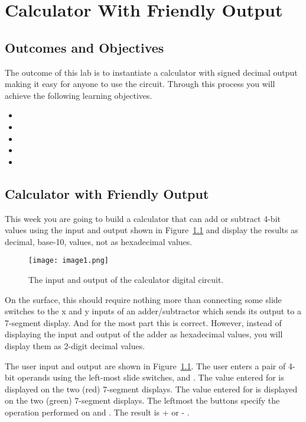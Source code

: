 \chapter{Calculator With Friendly Output}
\label{chapter:calc}
\graphicspath{{./Lab06Calculator/Fig}}

\section{Outcomes and Objectives}

The outcome of this lab is to instantiate a calculator with signed
decimal output making it easy for anyone to use the circuit.
Through this process you will achieve the following
learning objectives.
\begin{itemize}
    \item {}
    \item {}
    \item {}
    \item {}
    \item{}
\end{itemize}

\section{Calculator with Friendly Output}

This week you are going to build a calculator that can add or
subtract 4-bit values using the input and output shown in
Figure~\ref{fig:calcDevBoard} and display the results as
decimal, base-10, values, not as hexadecimal values.

\begin{figure}[ht]
    \texttt{[image:  image1.png]}
    \caption{The input and output of the calculator digital circuit.}
    \label{fig:calcDevBoard}
\end{figure}

On the surface, this should require nothing more
than connecting some slide switches to the x and y inputs of an
adder/subtractor which sends its output to a 7-segment display. And for
the most part this is correct. However, instead of displaying the input
and output of the adder as hexadecimal values, you will display them as
2-digit decimal values.

The user input and output are shown in Figure~\ref{fig:calcDevBoard}.
The user enters a pair of 4-bit operands using the left-most slide
switches,  and . The value entered for
 is displayed on the two (red) 
7-segment displays. The value entered for  is displayed
on the two (green)  7-segment displays. The leftmost
the  buttons specify the operation performed on
 and . The result is  +
 or  - .

